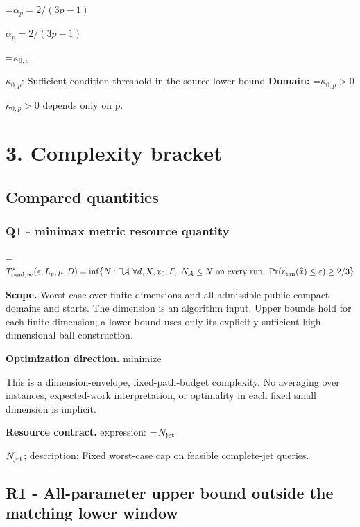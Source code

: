 \documentclass[10pt,a4paper]{article}
\newcommand{\AtlasMath}[1]{\par\begingroup\centering\setbox0=\hbox{$\displaystyle #1$}\ifdim\wd0>1.4\linewidth\typeout{ATLAS WIDE FORMULA: \the\wd0}\fi\ifdim\wd0>\linewidth\resizebox{\linewidth}{!}{\box0}\else\box0\fi\par\endgroup}
\newcommand{\AtlasInlineMath}[1]{\begingroup\setbox0=\hbox{$#1$}\ifdim\wd0>.4\linewidth\endgroup\AtlasMath{#1}\else\endgroup$#1$\fi}
\begin{document}
\AtlasInlineMath{\alpha_p=2/(3p-1)}



\AtlasInlineMath{\kappa_{0,p}}: Sufficient condition threshold in the source lower bound \textbf{Domain:} \AtlasInlineMath{\kappa_{0,p}>0} depends only on p.



\section{3. Complexity bracket}


\subsection{Compared quantities}


\subsubsection{Q1 - minimax metric resource quantity}


\AtlasMath{T^\star_{{\rm rand},\infty}(\varepsilon;L_p,\mu,D)=\inf\{N:\exists\mathcal A\ \forall d,X,x_0,F,\ N_{\mathcal A}\le N\ \text{on every run},\ \Pr(r_{\rm tan}(\widehat x)\le\varepsilon)\ge2/3\}}


\textbf{Scope.} Worst case over finite dimensions and all admissible public compact domains and starts. The dimension is an algorithm input. Upper bounds hold for each finite dimension; a lower bound uses only its explicitly sufficient high-dimensional ball construction.



\textbf{Optimization direction.} minimize



This is a dimension-envelope, fixed-path-budget complexity. No averaging over instances, expected-work interpretation, or optimality in each fixed small dimension is implicit.



\textbf{Resource contract.} expression: \AtlasInlineMath{N_{\rm jet}}; description: Fixed worst-case cap on feasible complete-jet queries.



\subsection{R1 - All-parameter upper bound outside the matching lower window}
\end{document}
